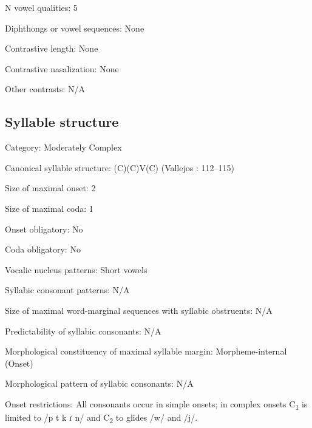 {\begin{appendixdesc}
\item[N vowel qualities:] 5

\item[Diphthongs or vowel sequences:] None

\item[Contrastive length:] None

\item[Contrastive nasalization:] None

\item[Other contrasts:] N/A
\end{appendixdesc}
\subsection*{Syllable structure}
\begin{appendixdesc}

\item[Category:] Moderately Complex

\item[Canonical syllable structure:] (C)(C)V(C) (Vallejos \citealt{Yopán2010}: 112--115)

\item[Size of maximal onset:] 2

\item[Size of maximal coda:] 1

\item[Onset obligatory:] No

\item[Coda obligatory:] No

\item[Vocalic nucleus patterns:] Short vowels

\item[Syllabic consonant patterns:] N/A

\item[Size of maximal word-marginal sequences with syllabic obstruents:] N/A

\item[Predictability of syllabic consonants:] N/A

\item[Morphological constituency of maximal syllable margin:] Morpheme-internal (Onset)

\item[Morphological pattern of syllabic consonants:] N/A

\item[Onset restrictions:] All consonants occur in simple onsets; in complex onsets C\textsubscript{1} is limited to /p t k ɾ n/ and C\textsubscript{2} to glides /w/ and /j/.


\end{appendixdesc}}
